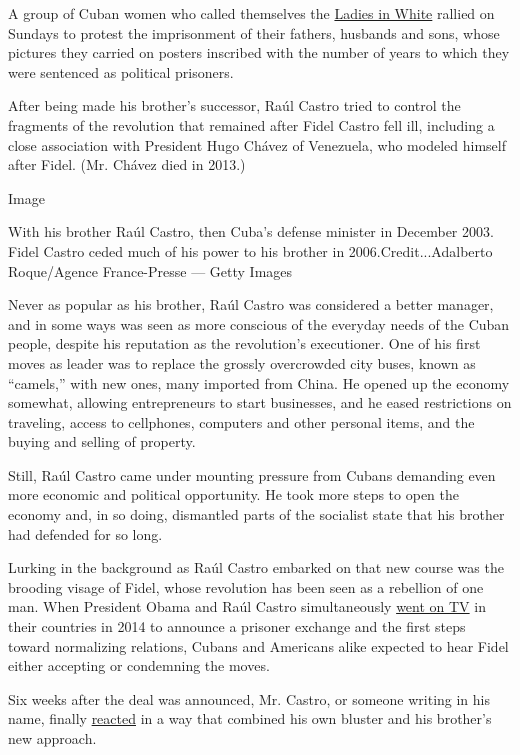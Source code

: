 A group of Cuban women who called themselves the
\href{http://www.nytimes3xbfgragh.onion/video/multimedia/100000003389586/ladies-in-white-march-in-havana.html}{Ladies
in White} rallied on Sundays to protest the imprisonment of their
fathers, husbands and sons, whose pictures they carried on posters
inscribed with the number of years to which they were sentenced as
political prisoners.

After being made his brother's successor, Raúl Castro tried to control
the fragments of the revolution that remained after Fidel Castro fell
ill, including a close association with President Hugo Chávez of
Venezuela, who modeled himself after Fidel. (Mr. Chávez died in 2013.)

Image

With his brother Raúl Castro, then Cuba's defense minister in December
2003. Fidel Castro ceded much of his power to his brother in
2006.Credit...Adalberto Roque/Agence France-Presse --- Getty Images

Never as popular as his brother, Raúl Castro was considered a better
manager, and in some ways was seen as more conscious of the everyday
needs of the Cuban people, despite his reputation as the revolution's
executioner. One of his first moves as leader was to replace the grossly
overcrowded city buses, known as ``camels,'' with new ones, many
imported from China. He opened up the economy somewhat, allowing
entrepreneurs to start businesses, and he eased restrictions on
traveling, access to cellphones, computers and other personal items, and
the buying and selling of property.

Still, Raúl Castro came under mounting pressure from Cubans demanding
even more economic and political opportunity. He took more steps to open
the economy and, in so doing, dismantled parts of the socialist state
that his brother had defended for so long.

Lurking in the background as Raúl Castro embarked on that new course was
the brooding visage of Fidel, whose revolution has been seen as a
rebellion of one man. When President Obama and Raúl Castro
simultaneously
\href{http://www.nytimes3xbfgragh.onion/video/world/americas/100000003332576/raul-castro-on-restoration-of-diplomacy.html}{went
on TV} in their countries in 2014 to announce a prisoner exchange and
the first steps toward normalizing relations, Cubans and Americans alike
expected to hear Fidel either accepting or condemning the moves.

Six weeks after the deal was announced, Mr. Castro, or someone writing
in his name, finally
\href{http://www.nytimes3xbfgragh.onion/2015/01/28/world/americas/fidel-castro-breaks-silence-over-thaw-in-us-cuba-relations.html}{reacted}
in a way that combined his own bluster and his brother's new approach.

